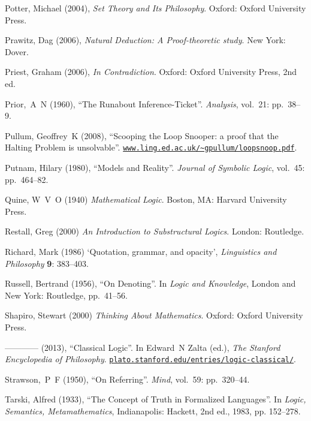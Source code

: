 \documentclass[openany,leqno,11pt,draft]{book}
\theoremstyle{break}
\theoremstyle{definition}
\theoremstyle{remark}
\begin{document}
{\begin{thebibliography}{39}
Potter, Michael (2004), \emph{Set Theory and Its Philosophy}. Oxford: Oxford
  University Press.

Prawitz, Dag (2006), \emph{Natural Deduction: A Proof-theoretic study}. New
  York: Dover.

Priest, Graham (2006), \emph{In Contradiction}. Oxford: Oxford University
  Press, 2nd ed.

Prior,~A~N (1960), \enquote{The Runabout Inference-Ticket}. \emph{Analysis},
  vol.~21: pp.~38–9.

Pullum, Geoffrey~K (2008), \enquote{Scooping the Loop Snooper: a proof that
  the Halting Problem is unsolvable}.
  \urlprefix\href{http://www.ling.ed.ac.uk/~gpullum/loopsnoop.pdf}{\nolinkurl{www.ling.ed.ac.uk/~gpullum/loopsnoop.pdf}}.

Putnam, Hilary (1980), \enquote{Models and Reality}. \emph{Journal of Symbolic
  Logic}, vol.~45: pp.~464–82.

 Quine, W~V~O (1940) \emph{Mathematical Logic}. Boston, MA: Harvard University Press.

Restall, Greg (2000) \emph{An Introduction to Substructural Logics}. London: Routledge.

 Richard, Mark (1986) `Quotation, grammar, and opacity', \emph{Linguistics and Philosophy} \textbf{9}: 383–403.

Russell, Bertrand (1956), \enquote{On Denoting}. In \emph{Logic and
  Knowledge}, London and New York: Routledge, pp.~41–56.

 Shapiro, Stewart (2000) \emph{Thinking About Mathematics}. Oxford: Oxford University Press.

---\!\!---\!\!---\!\!---  (2013), \enquote{Classical Logic}. In Edward~N Zalta (ed.),
  \emph{The Stanford Encyclopedia of Philosophy}. \urlprefix\href{http://plato.stanford.edu/entries/logic-classical/}{\nolinkurl{plato.stanford.edu/entries/logic-classical/}}.

Strawson,~P~F (1950), \enquote{On Referring}. \emph{Mind}, vol.~59:
  pp.~320–44.

Tarski, Alfred (1933), \enquote{The Concept of Truth in Formalized Languages}. 
  In \emph{Logic, Semantics, Metamathematics}, Indianapolis: Hackett, 2nd ed., 1983, pp.
  152–278.


\end{thebibliography}}
\end{document}
